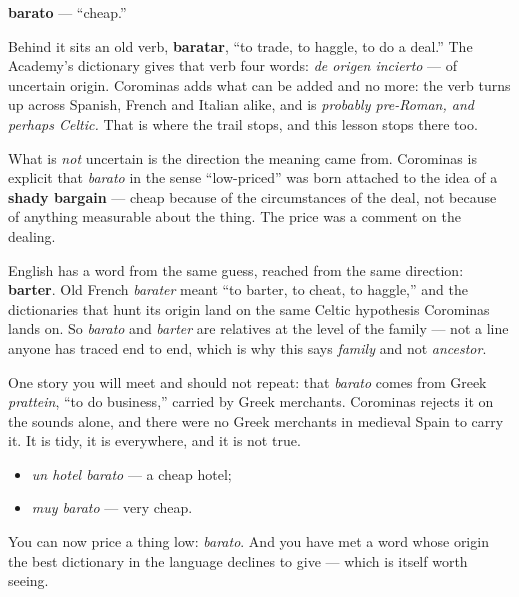 \begin{cousinweb}
\textbf{barato} — \textquotedblleft{}cheap.\textquotedblright{}

Behind it sits an old verb, \textbf{baratar}, \textquotedblleft{}to trade, to haggle, to do a deal.\textquotedblright{} The Academy's dictionary gives that verb four words: \emph{de origen incierto} — of uncertain origin. Corominas adds what can be added and no more: the verb turns up across Spanish, French and Italian alike, and is \emph{probably pre-Roman, and perhaps Celtic.} That is where the trail stops, and this lesson stops there too.

What is \emph{not} uncertain is the direction the meaning came from. Corominas is explicit that \emph{barato} in the sense \textquotedblleft{}low-priced\textquotedblright{} was born attached to the idea of a \textbf{shady bargain} — cheap because of the circumstances of the deal, not because of anything measurable about the thing. The price was a comment on the dealing.

English has a word from the same guess, reached from the same direction: \textbf{barter}. Old French \emph{barater} meant \textquotedblleft{}to barter, to cheat, to haggle,\textquotedblright{} and the dictionaries that hunt its origin land on the same Celtic hypothesis Corominas lands on. So \emph{barato} and \emph{barter} are relatives at the level of the family — not a line anyone has traced end to end, which is why this says \emph{family} and not \emph{ancestor}.

One story you will meet and should not repeat: that \emph{barato} comes from Greek \emph{prattein}, \textquotedblleft{}to do business,\textquotedblright{} carried by Greek merchants. Corominas rejects it on the sounds alone, and there were no Greek merchants in medieval Spain to carry it. It is tidy, it is everywhere, and it is not true.

\begin{itemize}
\raggedright
  \item \emph{un hotel barato} — a cheap hotel;
  \item \emph{muy barato} — very cheap.
\end{itemize}
\end{cousinweb}

\begin{grammarlens}[title={What you've built}]
You can now price a thing low: \emph{barato}. And you have met a word whose origin the best dictionary in the language declines to give — which is itself worth seeing.
\end{grammarlens}

